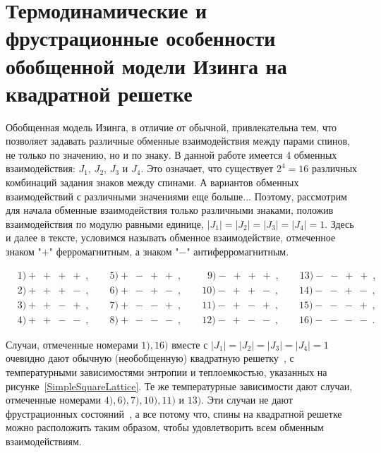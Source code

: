 \documentclass[utf8,12pt]{jetp}
\begin{document}
\section{Термодинамические и фрустрационные особенности обобщенной модели Изинга на квадратной решетке}

Обобщенная модель Изинга, в отличие от обычной, привлекательна тем, что позволяет задавать различные обменные взаимодействия между парами спинов, не только по значению, но и по знаку. В данной работе имеется 4 обменных взаимодействия: $J_1$, $J_2$, $J_3$ и $J_4$. Это означает, что существует $2^4 = 16$ различных комбинаций задания знаков между спинами. А вариантов обменных взаимодействий с различными значениями еще больше... Поэтому, рассмотрим для начала обменные взаимодействия только различными знаками, положив взаимодействия по модулю равными единице, $|J_1| = |J_2| = |J_3| = |J_4| = 1$. Здесь и далее в тексте, условимся называть обменное взаимодействие, отмеченное знаком "$+$" ферромагнитным, а знаком "$-$" антиферромагнитным.

\begin{align*}
 	&1) +\;+\;+\;+\;, \qquad   5) +\;-\;+\;+\;, \qquad	 \;\;9) -\;+\;+\;+\;, \qquad	 13) -\;-\;+\;+\;, \\
	&2) +\;+\;+\;-\;, \qquad  6) +\;-\;+\;-\;, \qquad	 10) -\;+\;+\;-\;, \qquad	 14) -\;-\;+\;-\;, \\
	&3) +\;+\;-\;+\;, \qquad  7) +\;-\;-\;+\;, \qquad  11) -\;+\;-\;+\;, \qquad	 15) -\;-\;-\;+\;, \\
	&4) +\;+\;-\;-\;, \qquad  8) +\;-\;-\;-\;, \qquad	 12) -\;+\;-\;-\;, \qquad	 16) -\;-\;-\;-\;.
\end{align*}

Случаи, отмеченные номерами $1), 16)$ вместе с $|J_1| = |J_2| = |J_3| = |J_4| = 1$ очевидно дают обычную (необобщенную) квадратную решетку~\cite{onsager1941}, с температурными зависимостями энтропии и теплоемкостью, указанных на рисунке~\ref{SimpleSquareLattice}. Те же температурные зависимости дают случаи, отмеченные номерами $4), 6), 7), 10), 11)$ и $13)$. Эти случаи не дают фрустрационных состояний~\cite{toulouse1977, vannimenus1977}, а все потому что, спины на квадратной решетке можно расположить таким образом, чтобы удовлетворить всем обменным взаимодействиям.
\end{document}
